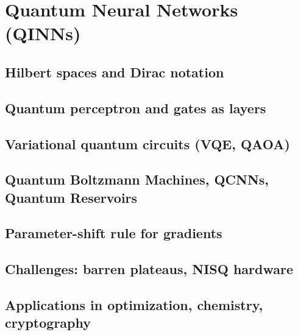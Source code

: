 ﻿\chapter{Quantum Neural Networks (QINNs)}
\section{Hilbert spaces and Dirac notation}

\section{Quantum perceptron and gates as layers}

\section{Variational quantum circuits (VQE, QAOA)}

\section{Quantum Boltzmann Machines, QCNNs, Quantum Reservoirs}

\section{Parameter-shift rule for gradients}

\section{Challenges: barren plateaus, NISQ hardware}

\section{Applications in optimization, chemistry, cryptography}


